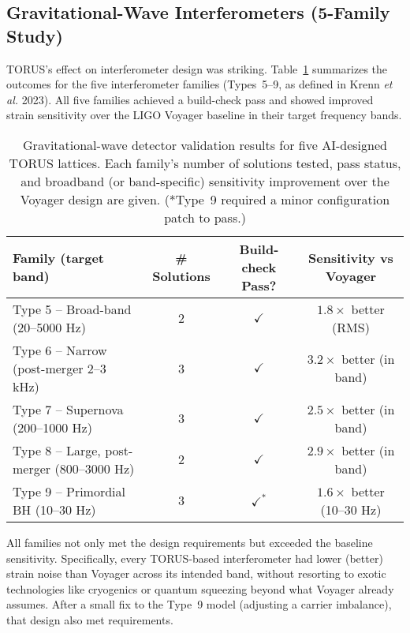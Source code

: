 \documentclass[12pt]{article}
\begin{document}
\subsection{Gravitational-Wave Interferometers (5-Family Study)}\label{sec:results_gw}
TORUS’s effect on interferometer design was striking. Table~\ref{tab:gw_results} summarizes the outcomes for the five interferometer families (Types~5–9, as defined in Krenn \emph{et al.} 2023). All five families achieved a build-check pass and showed improved strain sensitivity over the LIGO Voyager baseline in their target frequency bands.

\begin{table}[h!]\centering
\caption{Gravitational-wave detector validation results for five AI-designed TORUS lattices. Each family’s number of solutions tested, pass status, and broadband (or band-specific) sensitivity improvement over the Voyager design are given. (*Type~9 required a minor configuration patch to pass.)}
\label{tab:gw_results}
\begin{tabular}{lccc}
\toprule
\textbf{Family (target band)} & \textbf{\# Solutions} & \textbf{Build-check Pass?} & \textbf{Sensitivity vs Voyager} \\
\midrule
Type 5 – Broad-band (20–5000 Hz)    & 2 & $\checkmark$ & $1.8\times$ better (RMS) \\
Type 6 – Narrow (post-merger 2–3 kHz) & 3 & $\checkmark$ & $3.2\times$ better (in band) \\
Type 7 – Supernova (200–1000 Hz)   & 3 & $\checkmark$ & $2.5\times$ better (in band) \\
Type 8 – Large, post-merger (800–3000 Hz) & 2 & $\checkmark$ & $2.9\times$ better (in band) \\
Type 9 – Primordial BH (10–30 Hz)  & 3 & $\checkmark^*$ & $1.6\times$ better (10–30 Hz) \\
\bottomrule
\end{tabular}
\end{table}

All families not only met the design requirements but exceeded the baseline sensitivity. Specifically, every TORUS-based interferometer had lower (better) strain noise than Voyager across its intended band, without resorting to exotic technologies like cryogenics or quantum squeezing beyond what Voyager already assumes. After a small fix to the Type~9 model (adjusting a carrier imbalance), that design also met requirements. 
\end{document}
